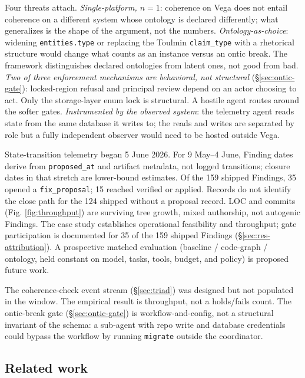 \documentclass[conference,10pt]{IEEEtran}
\begin{document}
Four threats attach. \emph{Single-platform, \(n=1\)}: coherence on Vega does
not entail coherence on a different system whose ontology is declared
differently; what generalizes is the shape of the argument, not the
numbers. \emph{Ontology-as-choice}: widening \texttt{entities.type} or replacing the
Toulmin \texttt{claim\_type} with a rhetorical structure would change what
counts as an instance versus an ontic break. The framework
distinguishes declared ontologies from latent ones, not good from bad. \emph{Two of three enforcement
mechanisms are behavioral, not structural}
(§\ref{sec:ontic-gate}): locked-region refusal and principal
review depend on an actor choosing to act. Only the storage-layer enum
lock is structural. A hostile agent routes around the softer gates. \emph{Instrumented by the observed
system}: the telemetry agent reads state from the same database it
writes to; the reads and writes are separated by role but a fully
independent observer would need to be hosted outside Vega.

State-transition telemetry began 5 June 2026. For 9 May--4 June,
Finding dates derive from \texttt{proposed\_at} and artifact metadata, not
logged transitions; closure dates in that stretch are lower-bound
estimates. Of the 159 shipped Findings, 35 opened a \texttt{fix\_proposal}; 15
reached verified or applied. Records do not identify the close path
for the 124 shipped without a proposal record. LOC and commits
(Fig. \ref{fig:throughput}) are surviving tree growth, mixed
authorship, not autogenic Findings. The
case study establishes operational feasibility and throughput; gate
participation is documented for 35 of the 159 shipped Findings
(§\ref{sec:res-attribution}). A prospective matched evaluation (baseline / code-graph / ontology, held constant on model, tasks, tools, budget, and policy) is proposed future work.

The coherence-check event stream (§\ref{sec:triad}) was
designed but not populated in the window. The empirical result is
throughput, not a holds/fails count. The ontic-break gate
(§\ref{sec:ontic-gate}) is workflow-and-config, not a
structural invariant of the schema: a sub-agent with repo write and
database credentials could bypass the workflow by running \texttt{migrate}
outside the coordinator.

\subsection{Related work}\label{sec:related}
\end{document}
